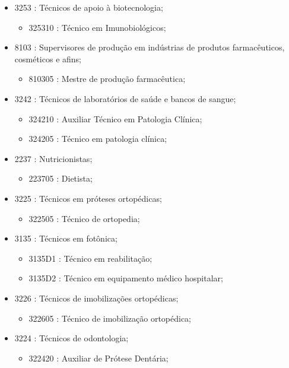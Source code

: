 \begin{itemize}
\begin{itemize}
\begin{itemize}
    \end{itemize}
    \item 3253 : Técnicos de apoio à biotecnologia;
    \begin{itemize}
      \item 325310 : Técnico em Imunobiológicos;
    \end{itemize}
    \item 8103 : Supervisores de produção em indústrias de produtos farmacêuticos, cosméticos e afins;
    \begin{itemize}
      \item 810305 : Mestre de produção farmacêutica;
    \end{itemize}
    \item 3242 : Técnicos de laboratórios de saúde e bancos de sangue;
    \begin{itemize}
      \item 324210 : Auxiliar Técnico em Patologia Clínica;
      \item 324205 : Técnico em patologia clínica;
    \end{itemize}
    \item 2237 : Nutricionistas;
    \begin{itemize}
      \item 223705 : Dietista;
    \end{itemize}
    \item 3225 : Técnicos em próteses ortopédicas;
    \begin{itemize}
      \item 322505 : Técnico de ortopedia;
    \end{itemize}
    \item 3135 : Técnicos em fotônica;
    \begin{itemize}
      \item 3135D1 : Técnico em reabilitação;
      \item 3135D2 : Técnico em equipamento médico hospitalar;
    \end{itemize}
    \item 3226 : Técnicos de imobilizações ortopédicas;
    \begin{itemize}
      \item 322605 : Técnico de imobilização ortopédica;
    \end{itemize}
    \item 3224 : Técnicos de odontologia;
    \begin{itemize}
      \item 322420 : Auxiliar de Prótese Dentária;

\end{itemize}
\end{itemize}
\end{itemize}
